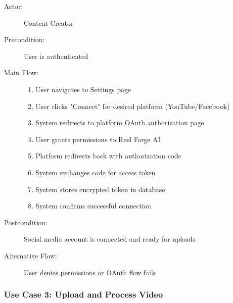 \begin{description}
    \item[Actor:] Content Creator
    \item[Precondition:] User is authenticated
    \item[Main Flow:] 
    \begin{enumerate}
        \item User navigates to Settings page
        \item User clicks "Connect" for desired platform (YouTube/Facebook)
        \item System redirects to platform OAuth authorization page
        \item User grants permissions to Reel Forge AI
        \item Platform redirects back with authorization code
        \item System exchanges code for access token
        \item System stores encrypted token in database
        \item System confirms successful connection
    \end{enumerate}
    \item[Postcondition:] Social media account is connected and ready for uploads
    \item[Alternative Flow:] User denies permissions or OAuth flow fails
\end{description}

\subsubsection{Use Case 3: Upload and Process Video}

